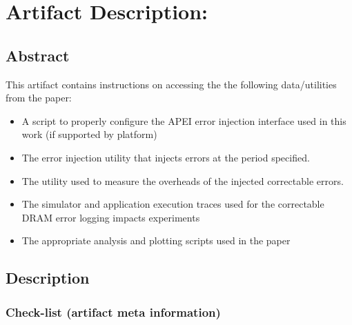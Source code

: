 \clearpage
\appendix
\section{Artifact Description: \myTitle}


\subsection{Abstract}

This artifact contains instructions on accessing the the following
data/utilities from the paper:
\begin{itemize}
        \item A script to properly configure the APEI error injection interface
                used in this work (if supported by platform)
        \item The error injection utility that injects errors at the period
                specified.
        \item The \selfish utility used to measure the overheads of the injected
                correctable errors.
        \item The \LogGOPSim simulator and application execution traces used for
                the correctable DRAM error logging impacts  experiments 
        \item The appropriate analysis and plotting scripts used in the paper
\end{itemize}

\subsection{Description}

\subsubsection{Check-list (artifact meta information)}

